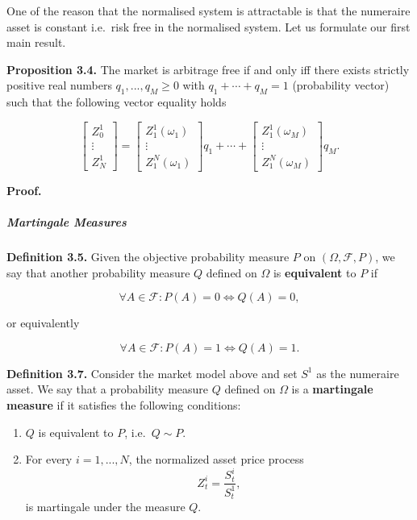 \documentclass[
]{article}
\providecommand{\tightlist}{%
  \setlength{\itemsep}{0pt}\setlength{\parskip}{0pt}}
\begin{document}
One of the reason that the normalised system is attractable is that the
numeraire asset is constant i.e.~risk free in the normalised system. Let
us formulate our first main result.

\textbf{Proposition 3.4.} The market is arbitrage free if and only iff
there exists strictly positive real numbers \(q_1,...,q_M\ge 0\) with
\(q_1+\cdots + q_M=1\) (probability vector) such that the following
vector equality holds

\[
\begin{bmatrix} Z_0^1\\
\vdots\\
Z_N^1\end{bmatrix}=\begin{bmatrix} Z_1^1(\omega_1)\\
\vdots\\
Z_1^N(\omega_1)\end{bmatrix}q_1+\cdots +\begin{bmatrix} Z_1^1(\omega_M)\\
\vdots\\
Z_1^N(\omega_M)\end{bmatrix}q_M.\tag{3.3}
\]

\textbf{Proof.}

\hypertarget{martingale-measures}{%
\subparagraph{Martingale Measures}\label{martingale-measures}}

\textbf{Definition 3.5.} Given the objective probability measure \(P\)
on \((\Omega,\mathcal{F},P)\), we say that another probability measure
\(Q\) defined on \(\Omega\) is \textbf{equivalent} to \(P\) if

\[
\forall A\in\mathcal{F}:P(A)=0\iff Q(A)=0,
\]

or equivalently

\[
\forall A\in\mathcal{F}:P(A)=1\iff Q(A)=1.
\]

\textbf{Definition 3.7.} Consider the market model above and set \(S^1\)
as the numeraire asset. We say that a probability measure \(Q\) defined
on \(\Omega\) is a \textbf{martingale measure} if it satisfies the
following conditions:

\begin{enumerate}
\def\labelenumi{\arabic{enumi}.}
\tightlist
\item
  \(Q\) is equivalent to \(P\), i.e.~\(Q\sim P\).
\item
  For every \(i=1,...,N\), the normalized asset price process \[
    Z_t^i=\frac{S_t^i}{S_t^1},
    \] is martingale under the measure \(Q\).
\end{enumerate}
\end{document}
